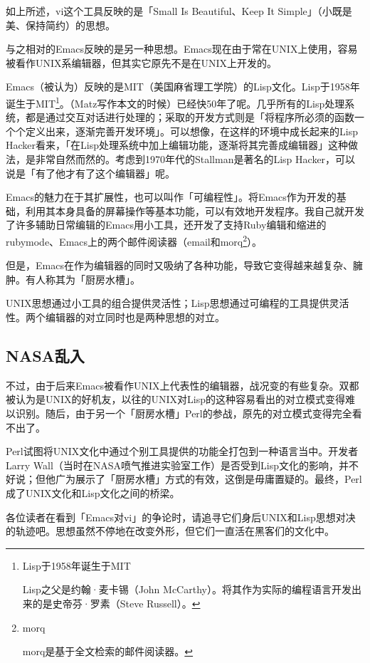 \documentclass[a4paper,12pt]{article}
\begin{document}
如上所述，vi这个工具反映的是「Small Is Beautiful、Keep It Simple」（小既是美、保持简约）的思想。

与之相对的Emacs反映的是另一种思想。Emacs现在由于常在UNIX上使用，容易被看作UNIX系编辑器，但其实它原先不是在UNIX上开发的。

Emacs（被认为）反映的是MIT（美国麻省理工学院）的Lisp文化。Lisp于1958年诞生于MIT\footnote{Lisp于1958年诞生于MIT

Lisp之父是约翰·麦卡锡（John McCarthy）。将其作为实际的编程语言开发出来的是史帝芬·罗素（Steve Russell）。}。（Matz写作本文的时候）已经快50年了呢。几乎所有的Lisp处理系统，都是通过交互对话进行处理的；采取的开发方式则是「将程序所必须的函数一个个定义出来，逐渐完善开发环境」。可以想像，在这样的环境中成长起来的Lisp Hacker看来，「在Lisp处理系统中加上编辑功能，逐渐将其完善成编辑器」这种做法，是非常自然而然的。考虑到1970年代的Stallman是著名的Lisp Hacker，可以说是「有了他才有了这个编辑器」呢。

Emacs的魅力在于其扩展性，也可以叫作「可编程性」。将Emacs作为开发的基础，利用其本身具备的屏幕操作等基本功能，可以有效地开发程序。我自己就开发了许多辅助日常编辑的Emacs用小工具，还开发了支持Ruby编辑和缩进的rubymode、Emacs上的两个邮件阅读器（email和morq\footnote{morq

morq是基于全文检索的邮件阅读器。}）。

但是，Emacs在作为编辑器的同时又吸纳了各种功能，导致它变得越来越复杂、臃肿。有人称其为「厨房水槽」。

UNIX思想通过小工具的组合提供灵活性；Lisp思想通过可编程的工具提供灵活性。两个编辑器的对立同时也是两种思想的对立。

\subsection{NASA乱入}

不过，由于后来Emacs被看作UNIX上代表性的编辑器，战况变的有些复杂。双都被认为是UNIX的好机友，以往的UNIX对Lisp的这种容易看出的对立模式变得难以识别。随后，由于另一个「厨房水槽」Perl的参战，原先的对立模式变得完全看不出了。

Perl试图将UNIX文化中通过个别工具提供的功能全打包到一种语言当中。开发者Larry Wall（当时在NASA喷气推进实验室工作）是否受到Lisp文化的影响，并不好说；但他广为展示了「厨房水槽」方式的有效，这倒是毋庸置疑的。最终，Perl成了UNIX文化和Lisp文化之间的桥梁。

各位读者在看到「Emacs对vi」的争论时，请追寻它们身后UNIX和Lisp思想对决的轨迹吧。思想虽然不停地在改变外形，但它们一直活在黑客们的文化中。
\end{document}
